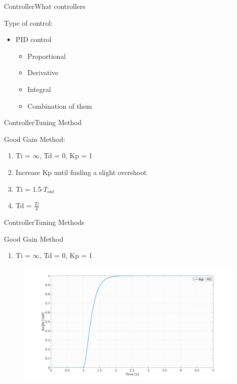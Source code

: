 \begin{frame}{Controller}{What controllers}
  \begin{block}{Type of control:}

	  \begin{itemize}
	  	\item PID control
	 	\begin{itemize}
	  	\item Proportional
	  	\item Derivative
	  	\item Integral
	  	\item Combination of them
	  \end{itemize}
	  \end{itemize}


  \end{block}
\end{frame}

\begin{frame}{Controller}{Tuning Method}
  \begin{block}{Good Gain Method:}
	  \begin{enumerate}
	  	\item Ti = $\infty$, Td = 0, Kp = 1
	  	\item Increase Kp until finding a slight overshoot
		\item Ti = 1.5$\cdot T_{out}$
		\item Td = $\frac{Ti}{4}$
	  \end{enumerate}
	  
  \end{block}
\end{frame}

\begin{frame}{Controller}{Tuning Methods}
  \begin{block}{Good Gain Method}
  
	  \begin{enumerate}
	  	\item Ti = $\infty$, Td = 0, Kp = 1
	  \end{enumerate}
	  \begin{figure}
       \includegraphics[scale=0.20]{../report/figures/GG1.png}
      \end{figure}
  
  \end{block}
\end{frame}

